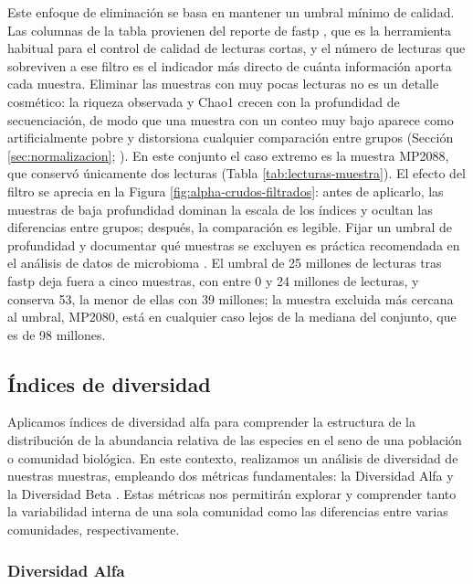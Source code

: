 Este enfoque de eliminación se basa en mantener un umbral mínimo de calidad. Las columnas de la
tabla provienen del reporte de fastp \citep{chen2018fastp}, que es la herramienta habitual para el
control de calidad de lecturas cortas, y el número de lecturas que sobreviven a ese filtro es el
indicador más directo de cuánta información aporta cada muestra. Eliminar las muestras con muy pocas
lecturas no es un detalle cosmético: la riqueza observada y Chao1 crecen con la profundidad de
secuenciación, de modo que una muestra con un conteo muy bajo aparece como artificialmente pobre y
distorsiona cualquier comparación entre grupos (Sección \ref{sec:normalizacion};
\citealp{mcmurdie2014waste, weiss2017normalization}). En este conjunto el caso extremo es la muestra
MP2088, que conservó únicamente dos lecturas (Tabla \ref{tab:lecturas-muestra}). El efecto del filtro
se aprecia en la Figura \ref{fig:alpha-crudos-filtrados}: antes de aplicarlo, las muestras de baja
profundidad dominan la escala de los índices y ocultan las diferencias entre grupos; después, la
comparación es legible. Fijar un umbral de profundidad y documentar qué muestras se excluyen es
práctica recomendada en el análisis de datos de microbioma \citep{xia2018statistical,
kleinebardenhorst2021data}. El umbral de 25 millones de lecturas tras fastp deja fuera a cinco
muestras, con entre 0 y 24 millones de lecturas, y conserva 53, la menor de ellas con 39 millones; la
muestra excluida más cercana al umbral, MP2080, está en cualquier caso lejos de la mediana del
conjunto, que es de 98 millones.\\


\subsection{Índices de diversidad}

Aplicamos índices de diversidad alfa para comprender la estructura de la distribución de la abundancia relativa de las especies en el seno de una 
población o comunidad biológica. En este contexto, realizamos un análisis de diversidad de nuestras 
muestras, empleando dos métricas fundamentales: la Diversidad Alfa y la Diversidad 
Beta \citep{tuomisto2010diversity}. Estas métricas nos permitirán explorar y comprender tanto la variabilidad 
interna de una sola comunidad como las diferencias entre varias comunidades, respectivamente.\\ 


\subsubsection{Diversidad Alfa}

